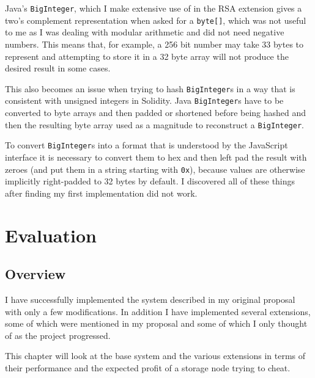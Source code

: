 \documentclass[12pt,a4paper,twoside,openright]{report}
\begin{document}
Java's \texttt{BigInteger}, which I make extensive use of in the RSA extension gives a two's complement representation
when asked for a \texttt{byte[]}, which was not useful to me as I was dealing with modular arithmetic and did not need negative numbers.
This means that, for example, a 256 bit number may take 33 bytes to represent and attempting to store it in a 32 byte array
will not produce the desired result in some cases.

This also becomes an issue when trying to hash \texttt{BigInteger}s in a way that is consistent with unsigned integers in Solidity.
Java \texttt{BigInteger}s have to be converted to byte arrays and then padded or shortened before being hashed and then the resulting byte array
used as a magnitude to reconstruct a \texttt{BigInteger}.

To convert \texttt{BigInteger}s into a format that is understood by the JavaScript interface it is necessary to convert them to hex and then left pad the result with zeroes
(and put them in a string starting with \texttt{0x}), because values are otherwise implicitly right-padded to 32 bytes by default.
I discovered all of these things after finding my first implementation did not work.



\chapter{Evaluation}

\section{Overview}

I have successfully implemented the system described in my original proposal with only a few modifications.
In addition I have implemented several extensions, some of which were mentioned in my proposal and some of which
I only thought of as the project progressed.

This chapter will look at the base system and the various extensions in terms of their performance and the expected profit of a
storage node trying to cheat.

\end{document}
